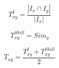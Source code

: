 \begin{minipage}{.3\linewidth}
\centering
\begin{equation}
T_{xy}^{I} = \frac {|I_x \cap I_y|}{|I_x|}
\label{eq:communityTrust}
\end{equation}
\end{minipage}
\begin{comment}
\quad
\begin{minipage}{.7\linewidth}
\begin{equation}
\footnotesize
T_{xy}^{I} = \left \{
\begin{array}{cl} 
\rev{0}, & se  \; \; I_y \not\supset \{sa\Acute{u}de\} \\
]0,1[,	& se \; \; I_x \cap I_y \neq 0 \; \; e \; \; I_x \neq I_y \; e \; \{sa\Acute{u}de\} \subset I_x \cap I_y\\
1, 	& se \; \; I_x = I_y \; \; e \; \; \{sa\Acute{u}de\} \subset I_x \cap I_y
\end{array}
\right.
\label{eq:valuesTCoI}
\end{equation}
\end{minipage}
\end{comment}
\begin{minipage}{.3\linewidth}
\centering
\begin{equation}
T_{xy}^{Skill} = Sim_y
\label{eq:SkillTrust}
\end{equation}
\end{minipage}
\begin{comment}
\vspace{0.4cm}
\quad
\begin{minipage}{.7\linewidth}
\begin{equation}
T_{xy}^{Skill} = \left \{
\begin{array}{cl} 
0,	& se \; s_y \; \in \{outras\} \\
]0,1[,	& se \; s_y \; \notin \{outras, m\Acute{e}dico\} \\
1, 	& se \; s_y \; \in \{m\Acute{e}dico\}
\end{array}
\right.
\label{eq:valuesTSkill}
\end{equation}
\end{minipage}
\end{comment}
\begin{minipage}{.3\linewidth}
\centering
\begin{equation}
T_{xy} = \frac{T_{xy}^{I} + T_{xy}^{Skill}}{2}
\label{eq:totalTrust}
\end{equation}
\end{minipage}